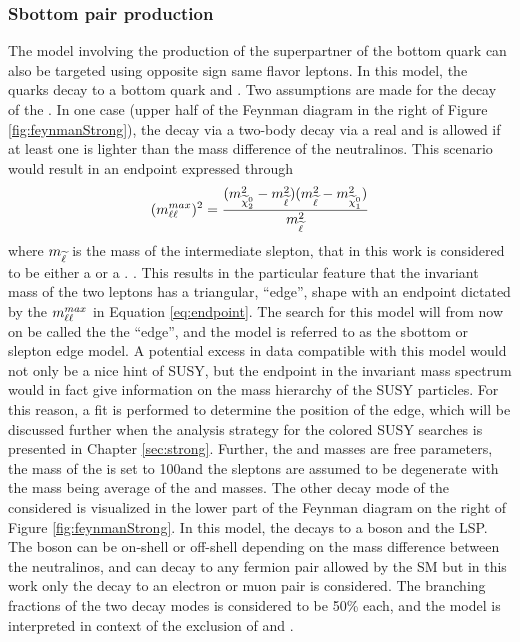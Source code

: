 \subsubsection*{Sbottom pair production}
\noindent\justify
The model involving the production of the superpartner of the bottom quark can also be targeted using opposite sign same flavor leptons.
In this model, the \sbottom quarks decay to a bottom quark and \PSGczDt. 
Two assumptions are made for the decay of the \PSGczDt. 
In one case (upper half of the Feynman diagram in the right of Figure \ref{fig:feynmanStrong}), the \PSGczDt decay via a two-body decay via a real \slep and is allowed if at least one \slep is lighter than the mass difference of the neutralinos. 
This scenario would result in an endpoint expressed through
\begin{equation}
(m_{\ell\ell}^{max})^{2}=\frac{(m_{\widetilde{\chi}^{0}_{2}}^{2}-m_{\widetilde{\ell}}^{2})(m_{\widetilde{\ell}}^{2}-m_{\widetilde{\chi}^{0}_{1}}^{2})}{m_{\widetilde{\ell}}^{2}}
\label{eq:endpoint}
\end{equation}
where $m_{\widetilde{\ell}}$ is the mass of the intermediate slepton, that in this work is considered to be either a \se or a \sm. . 
This results in the particular feature that the invariant mass of the two leptons has a triangular, ``edge'', shape with an endpoint dictated by the $m_{\ell\ell}^{max}$ in Equation \ref{eq:endpoint}. 
The search for this model will from now on be called the the ``edge'', and the model is referred to as the sbottom or slepton edge model. 
A potential excess in data compatible with this model would not only be a nice hint of SUSY, but the endpoint in the invariant mass spectrum would in fact give information on the mass hierarchy of the SUSY particles. 
For this reason, a fit is performed to determine the position of the edge, which will be discussed further when the analysis strategy for the colored SUSY searches is presented in Chapter \ref{sec:strong}. 
Further, the \sbottom and \PSGczDt masses are free parameters, the mass of the \PSGczDo is set to 100\GeV and the sleptons are assumed to be degenerate with the mass being average of the \PSGczDt and \PSGczDo masses. 
\newpara
\noindent\justify
The other decay mode of the \PSGczDt considered is visualized in the lower part of the Feynman diagram on the right of Figure \ref{fig:feynmanStrong}.
In this model, the \PSGczDt decays to a \PZ boson and the \PSGczDo LSP. 
The \PZ boson can be on-shell or off-shell depending on the mass difference between the neutralinos, and can decay to any fermion pair allowed by the SM but in this work only the decay to an electron or muon pair is considered. 
The branching fractions of the two \PSGczDt decay modes is considered to be 50\% each, and the model is interpreted in context of the exclusion of \sbottom and \PSGczDt. 
